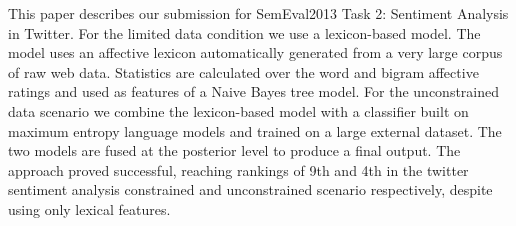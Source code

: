This paper describes our submission for SemEval2013 Task 2: Sentiment Analysis in Twitter.
 For the limited data condition we use a lexicon-based model.
 The model uses an affective lexicon automatically generated from a very large
 corpus of raw web data.
 Statistics are calculated over the word and bigram affective ratings and used
 as features of a Naive Bayes tree model.
 For the unconstrained data scenario we combine the lexicon-based model with a
 classifier built on maximum entropy language models and trained on a large
 external dataset.
 The two models are fused at the posterior level to produce a final output.
 The approach proved successful, reaching rankings of 9th and 4th in the twitter
 sentiment analysis constrained and unconstrained scenario respectively, despite
 using only lexical features.

